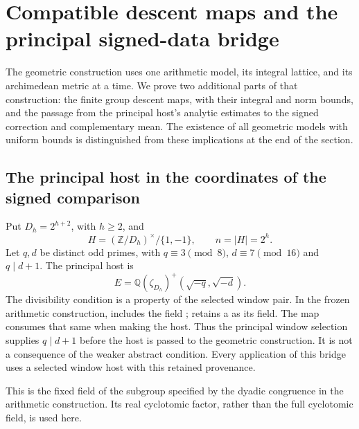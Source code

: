 \section{Compatible descent maps and the principal signed-data bridge}
\label{sec:sr-compatible-descent}

The geometric construction uses one arithmetic model, its integral
lattice, and its archimedean metric at a time.  We prove two additional
parts of that construction: the finite group descent maps, with their
integral and norm bounds, and the passage from the principal host's
analytic estimates to the signed correction and complementary mean.
The existence of all geometric models with uniform bounds is distinguished
from these implications at the end of the section.

\subsection{The principal host in the coordinates of the signed comparison}
\label{sec:sr-principal-coordinate-bridge}

Put \(D_h=2^{h+2}\), with \(h\geq2\), and
\[
 H=(\mathbb Z/D_h)^\times/\{1,-1\},\qquad n=|H|=2^h .
\]
Let \(q,d\) be distinct odd primes, with \(q\equiv3\pmod8\),
\(d\equiv7\pmod{16}\) and \(q\mid d+1\).  The principal host is
\[
 E=\mathbb Q(\zeta_{D_h})^+(\sqrt{-q},\sqrt{-d}).
\]
The divisibility condition is a property of the selected window pair.
In the frozen arithmetic construction,
 includes the field
;  retains
a  as its  field.
The map  consumes that
same  when making the host.
Thus the principal window selection supplies \(q\mid d+1\) before
the host is passed to the geometric construction.
It is not a consequence of the weaker abstract 
condition.  Every application of this bridge uses a selected window
host with this retained provenance.

This is the fixed field of the subgroup specified by the dyadic
congruence in the arithmetic construction.  Its real cyclotomic
factor, rather than the full cyclotomic field, is used here.

